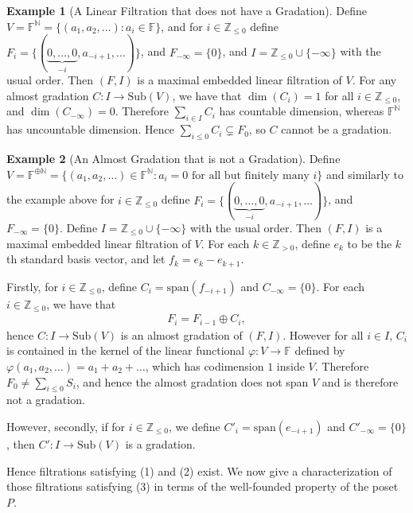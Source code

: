 \documentclass[oneside,11pt]{amsart}
\newcommand{\zz}{\ensuremath{\mathbb{Z}}}
\newcommand{\nn}{\ensuremath{\mathbb{N}}}
\newcommand{\ff}{\ensuremath{\mathbb{F}}}
\newcommand{\Sub}{\ensuremath{\text{Sub}}}
\newcommand{\Span}{\ensuremath{\text{span}}}
\theoremstyle{definition}
\newtheorem{example}{Example}
\newtheorem{proof techniques}{Proof Techniques}
\begin{document}
\begin{example}[A Linear Filtration that does not have a Gradation]
Define $V = \ff^\nn = \{ (a_1, a_2, \ldots ) : a_i \in \ff \}$, and for $i \in \zz_{\leq 0}$ define $F_i = \{ (\underbrace{0 , \ldots, 0}_{-i} , a_{-i + 1}, \ldots ) \}$, and $F_{-\infty} = \{ 0 \}$, and $I = \zz_{\leq 0 } \cup \{ -\infty \}$ with the usual order. Then $(F , I)$ is a maximal embedded linear filtration of $V$. For any almost gradation $C: I \to \Sub(V)$, we have that $\dim(C_i) = 1$ for all $i \in \zz_{\leq 0}$, and $\dim(C_{-\infty}) = 0$. Therefore $\sum_{i \in I} C_i$ has countable dimension, whereas $\ff^\nn$ has uncountable dimension. Hence $\sum_{i \leq 0} C_i \subsetneq F_0$, so $C$ cannot be a gradation. 
\end{example}

\begin{example}[An Almost Gradation that is not a Gradation]
Define $V = \ff^{\oplus \nn} = \{ (a_1, a_2, \ldots ) \in \ff^\nn : a_i = 0 \text{ for all but finitely many } i \}$ and similarly to the example above for $i \in \zz_{\leq 0}$ define $F_i = \{ (\underbrace{0 , \ldots, 0}_{-i} , a_{-i + 1}, \ldots ) \}$, and $F_{-\infty} = \{ 0 \}$. Define $I = \zz_{\leq 0 } \cup \{ -\infty \}$ with the usual order. Then $(F , I)$ is a maximal embedded linear filtration of $V$. For each $k \in \zz_{>0}$, define $e_{k}$ to be the $k$th standard basis vector, and let $f_k = e_k - e_{k + 1}$. 

Firstly, for $i \in \zz_{\leq 0}$, define $C_{i} = \Span(f_{-i + 1})$ and $C_{-\infty} = \{ 0 \}$. For each $i \in \zz_{\leq 0}$, we have that 
\begin{align*}
F_i = F_{i - 1} \oplus C_i,
\end{align*}
hence $C: I \to \Sub(V)$ is an almost gradation of $(F , I)$. However for all $i \in I$, $C_i$ is contained in the kernel of the linear functional $\varphi: V \to \ff$ defined by $\varphi(a_1, a_2, \ldots ) = a_1 + a_2 + \ldots$, which has codimension $1$ inside $V$. Therefore $F_0 \neq \sum_{i \leq 0} S_i$, and hence the almost gradation does not span $V$ and is therefore not a gradation. 

However, secondly, if for $i \in \zz_{\leq 0}$, we define $C'_{i} = \Span(e_{-i + 1})$ and $C'_{-\infty} = \{ 0 \}$, then $C': I \to \Sub(V)$ is a gradation. 
\end{example} 

Hence filtrations satisfying (1) and (2) exist. We now give a characterization of those filtrations satisfying (3) in terms of the well-founded property of the poset $P$. 
\end{document}
